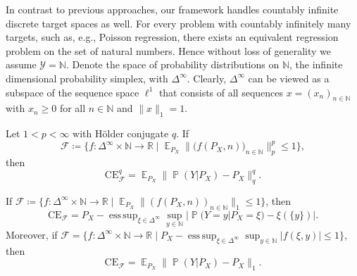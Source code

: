 \documentclass{article}
\DeclareMathOperator{\Prob}{\mathbb{P}}
\DeclareMathOperator{\Exp}{\mathbb{E}}
\DeclareMathOperator*{\esssup}{ess\,sup}
\begin{document}
In contrast to previous approaches, our framework handles countably infinite discrete target spaces
as well. For every problem with countably infinitely many targets, such as, e.g., Poisson regression,
there exists an equivalent regression problem on the set of natural numbers. Hence without loss of generality
we assume $\mathcal{Y} = \mathbb{N}$. Denote the space of probability distributions on $\mathbb{N}$,
the infinite dimensional probability simplex, with $\Delta^\infty$. Clearly, $\Delta^\infty$ can be
viewed as a subspace of the sequence space $\ell^1$ that consists of all sequences $x = (x_n)_{n \in \mathbb{N}}$
with $x_n \geq 0$ for all $n \in \mathbb{N}$ and $\|x\|_{1} = 1$.

\begin{theorem}\label{thm:ece_infinite}
    Let $1 < p < \infty$ with Hölder conjugate $q$. If
    \begin{equation*}
        \mathcal{F} \coloneqq \{f \colon \Delta^{\infty} \times \mathbb{N} \to \mathbb{R} \mid
    \Exp_{P_X} \|\big(f(P_X, n)\big)_{n \in \mathbb{N}}\|_{p}^p \leq 1 \},
    \end{equation*}
    then
    \begin{equation*}
        \mathrm{CE}^q_{\mathcal{F}} = \Exp_{P_X} \|\Prob(Y|P_X) - P_X\|_{q}^q.
    \end{equation*}
    
    If $\mathcal{F} \coloneqq \{f \colon \Delta^{\infty} \times \mathbb{N} \to \mathbb{R} \mid \Exp_{P_X} \|(f(P_X,n))_{n \in \mathbb{N}}\|_1 \leq 1\}$,
    then
    \begin{equation*}
        \mathrm{CE}_{\mathcal{F}} = P_X-\esssup_{\xi \in \Delta^{\infty}} \sup_{y \in \mathbb{N}} |\Prob(Y=y|P_X=\xi) - \xi(\{y\})|.
    \end{equation*}
    Moreover, if
    $\mathcal{F} = \{f \colon \Delta^{\infty} \times \mathbb{N} \to \mathbb{R} \mid P_X-\esssup_{\xi \in \Delta^\infty} \sup_{y \in \mathbb{N}} |f(\xi, y)| \leq 1\}$,
    then
    \begin{equation*}
        \mathrm{CE}_{\mathcal{F}} = \Exp_{P_X} \|\Prob(Y|P_X) - P_X\|_1.
    \end{equation*}
\end{theorem}
\end{document}

